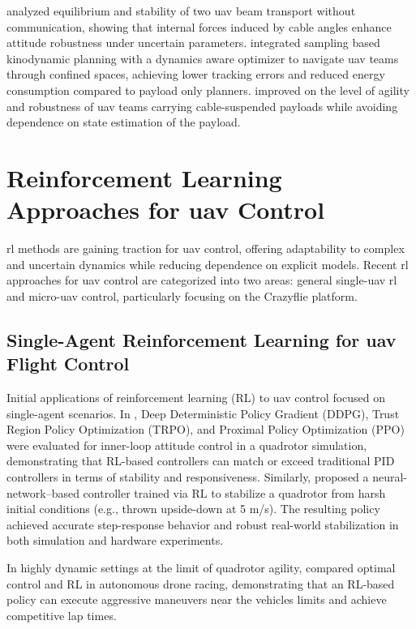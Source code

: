 \cite{gabellieri_equilibria_2023} analyzed equilibrium and stability of two \gls{uav} beam transport without communication, showing that internal forces induced by cable angles enhance attitude robustness under uncertain parameters. \cite{wahba_kinodynamic_2024} integrated sampling based kinodynamic planning with a dynamics aware optimizer to navigate \gls{uav} teams through confined spaces, achieving lower tracking errors and reduced energy consumption compared to payload only planners. \cite{Wang2025SafeAA} improved on the level of agility and robustness of \gls{uav} teams carrying cable-suspended payloads while avoiding dependence on state estimation of the payload.


\section{Reinforcement Learning Approaches for \gls{uav} Control}
\gls{rl} methods are gaining traction for \gls{uav} control, offering adaptability to complex and uncertain dynamics while reducing dependence on explicit models. Recent \gls{rl} approaches for \gls{uav} control are categorized into two areas: general single-\gls{uav} \gls{rl} and micro-\gls{uav} control, particularly focusing on the Crazyflie platform.

\subsection{Single-Agent Reinforcement Learning for \gls{uav} Flight Control}

Initial applications of reinforcement learning (RL) to \gls{uav} control focused on single-agent scenarios. In \cite{Koch2018ReinforcementLF}, Deep Deterministic Policy Gradient (DDPG), Trust Region Policy Optimization (TRPO), and Proximal Policy Optimization (PPO) were evaluated for inner-loop attitude control in a quadrotor simulation, demonstrating that RL-based controllers can match or exceed traditional PID controllers in terms of stability and responsiveness. Similarly, \cite{Hwangbo2017ControlOA} proposed a neural-network–based controller trained via RL to stabilize a quadrotor from harsh initial conditions (e.g., thrown upside-down at 5 m/s). The resulting policy achieved accurate step-response behavior and robust real-world stabilization in both simulation and hardware experiments.  

In highly dynamic settings at the limit of quadrotor agility, \cite{Song2023ReachingTL} compared optimal control and RL in autonomous drone racing, demonstrating that an RL-based policy can execute aggressive maneuvers near the vehicles limits and achieve competitive lap times.  

